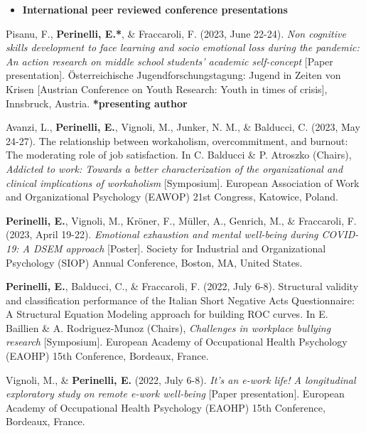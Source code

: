 \documentclass[hidelinks, letterpaper,10pt]{article} %
\begin{document}
\begin{itemize} 
	\setlength{\topsep}{0pt}%
	\setlength{\leftmargin}{0.1in}%
	\setlength{\listparindent}{-0.1in}%
	\setlength{\itemindent}{-0.2in}%
	\setlength{\parsep}{\parskip}%
	
	\item {\textbf{\large{International peer reviewed conference presentations}}}
\end{itemize}
\begin{etaremune}


	\item Pisanu, F., \textbf{Perinelli, E.*}, \& Fraccaroli, F. (2023, June 22-24). \textit{Non cognitive skills development to face learning and socio emotional loss during the pandemic: An action research on middle school students' academic self-concept} [Paper presentation]. Österreichische Jugendforschungstagung: Jugend in Zeiten von Krisen [Austrian Conference on Youth Research: Youth in times of crisis], Innsbruck, Austria. \textbf{*presenting author}

	\item Avanzi, L., \textbf{Perinelli, E.}, Vignoli, M., Junker, N. M., \& Balducci, C. (2023, May 24-27). The relationship between workaholism, overcommitment, and burnout: The moderating role of job satisfaction. In C. Balducci \& P. Atroszko (Chairs), \textit{Addicted to work: Towards a better characterization of the organizational and clinical implications of workaholism} [Symposium]. European Association of Work and Organizational Psychology (EAWOP) 21st Congress, Katowice, Poland.

	\item \textbf{Perinelli, E.}, Vignoli, M., Kröner, F., Müller, A., Genrich, M., \& Fraccaroli, F. (2023, April 19-22). \textit{Emotional exhaustion and mental well-being during COVID-19: A DSEM approach} [Poster]. Society for Industrial and Organizational Psychology (SIOP) Annual Conference, Boston, MA, United States.

    \item \textbf{Perinelli, E.}, Balducci, C., \& Fraccaroli, F. (2022, July 6-8). Structural validity and classification performance of the Italian Short Negative Acts Questionnaire: A Structural Equation Modeling approach for building ROC curves. In E. Baillien \& A. Rodriguez-Munoz (Chairs), \textit{Challenges in workplace bullying research} [Symposium]. European Academy of Occupational Health Psychology (EAOHP) 15th Conference, Bordeaux, France.
    
    \item Vignoli, M., \& \textbf{Perinelli, E.} (2022, July 6-8). \textit{It’s an e-work life! A longitudinal exploratory study on remote e-work well-being} [Paper presentation]. European Academy of Occupational Health Psychology (EAOHP) 15th Conference, Bordeaux, France. 


\end{etaremune}
\end{document}
